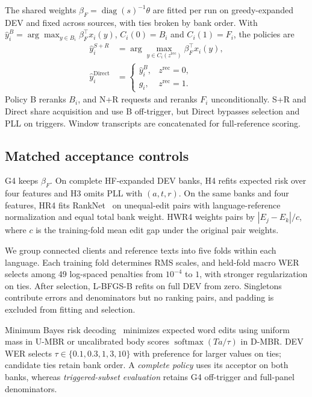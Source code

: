 \documentclass[conference,letterpaper]{IEEEtran}
\begin{document}
The shared weights $\beta_F=\operatorname{diag}(s)^{-1}\theta$ are fitted per run on greedy-expanded DEV and fixed across sources, with ties broken by bank order. With $\hat{y}_i^B=\arg\max_{y\in B_i}\beta_F^\top x_i(y)$, $C_i(0)=B_i$ and $C_i(1)=F_i$, the policies are
\begin{equation}
\begin{aligned}
\hat{y}_i^{S+R}&=\arg\max_{y\in C_i(z^{\mathrm{rec}})}\beta_F^\top x_i(y),\\
\hat{y}_i^{\mathrm{Direct}}&=\begin{cases}\hat{y}_i^B,&z^{\mathrm{rec}}=0,\\g_i,&z^{\mathrm{rec}}=1.\end{cases}
\end{aligned}\label{eq:accept}
\end{equation}
Policy B reranks $B_i$, and N+R requests and reranks $F_i$ unconditionally. S+R and Direct share acquisition and use B off-trigger, but Direct bypasses selection and PLL on triggers. Window transcripts are concatenated for full-reference scoring.

\subsection{Matched acceptance controls}
G4 keeps $\beta_F$. On complete HF-expanded DEV banks, H4 refits expected risk over four features and H3 omits PLL with $(a,t,r)$. On the same banks and four features, HR4 fits RankNet~\cite{ranknet2005} on unequal-edit pairs with language-reference normalization and equal total bank weight. HWR4 weights pairs by $|E_j-E_k|/c$, where $c$ is the training-fold mean edit gap under the original pair weights.


We group connected clients and reference texts into five folds within each language. Each training fold determines RMS scales, and held-fold macro WER selects among 49 log-spaced penalties from $10^{-4}$ to $1$, with stronger regularization on ties.
After selection, L-BFGS-B refits on full DEV from zero. Singletons contribute errors and denominators but no ranking pairs, and padding is excluded from fitting and selection.

Minimum Bayes risk decoding~\cite{goel2000mbr} minimizes expected word edits using uniform mass in U-MBR or uncalibrated body scores $\operatorname{softmax}(Ta/\tau)$ in D-MBR. DEV WER selects $\tau\in\{0.1,0.3,1,3,10\}$ with preference for larger values on ties; candidate ties retain bank order. A \emph{complete policy} uses its acceptor on both banks, whereas \emph{triggered-subset evaluation} retains G4 off-trigger and full-panel denominators.
\end{document}
